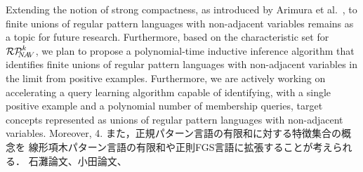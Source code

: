 Extending the notion of strong compactness, as introduced by Arimura et al.~\cite{Arimura1996}, to finite unions of regular pattern languages with non-adjacent variables remains as a topic for future research.
Furthermore, based on the characteristic set for $\mathcal{RP}^{k}_{\!\!\!N\!A\!V}$, we plan to propose a polynomial-time inductive inference algorithm that identifies finite unions of regular pattern languages with non-adjacent variables in the limit from positive examples.
Furthermore, we are actively working on accelerating a query learning algorithm capable of identifying, with a single positive example and a polynomial number of membership queries, target concepts represented as unions of regular pattern languages with non-adjacent variables.
Moreover, 
{\color{green} 4. また，正規パターン言語の有限和に対する特徴集合の概念を
線形項木パターン言語\cite{Suzuki2006}の有限和や正則FGS言語\cite{Uchida1994}に拡張することが考えられる．}
\cite{Uchida2019}
石灘論文\cite{Ishinada2023}、小田論文、


